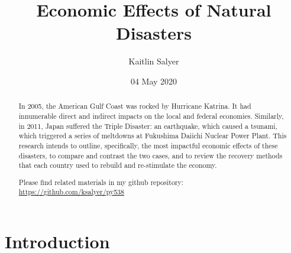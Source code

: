 \documentclass[%
 reprint,
 amsmath,amssymb,
 aps,
]{revtex4-1}
\begin{document}
\title{Economic Effects of Natural Disasters}%

\author{Kaitlin Salyer}

\date{04 May 2020}

\begin{abstract}

In 2005, the American Gulf Coast was rocked by Hurricane Katrina. It had innumerable direct and indirect impacts on the local and federal economies. Similarly, in 2011, Japan suffered the Triple Disaster: an earthquake, which caused a tsunami, which triggered a series of meltdowns at Fukushima Daiichi Nuclear Power Plant. This research intends to outline, specifically, the most impactful economic effects of these disasters, to compare and contrast the two cases, and to review the recovery methods that each country used to rebuild and re-stimulate the economy.\\

\begin{center}
	Please find related materials in my github repository:
	\url{https://github.com/ksalyer/py538}
\end{center}

\end{abstract}

\maketitle


\section{\label{sec:level1}Introduction}
\end{document}
